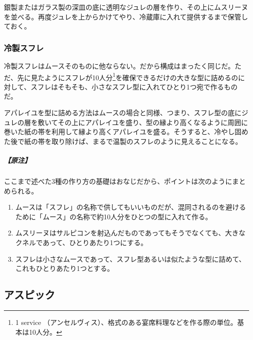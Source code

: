 \begin{recette}
銀製またはガラス製の深皿の底に透明なジュレの層を作り、その上にムスリーヌを並べる。再度ジュレを上からかけてやり、冷蔵庫に入れて提供するまで保管しておく。

\hypertarget{souffles-froids}{%
\subsubsection{冷製スフレ}\label{souffles-froids}}



冷製スフレはムースそのものに他ならない。だから構成はまったく同じだ。ただ、先に見たようにスフレが10人分\footnote{1
  service
  （アンセルヴィス）、格式のある宴席料理などを作る際の単位。基本は10人分。}を確保できるだけの大きな型に詰めるのに対して、スフレはそもそも、小さなスフレ型に入れてひとり1つ宛で作るものだ。

アパレイユを型に詰める方法はムースの場合と同様、つまり、スフレ型の底にジュレの層を敷いてその上にアパレイユを盛り、型の縁より高くなるように周囲に巻いた紙の帯を利用して縁より高くアパレイユを盛る。そうすると、冷やし固めた後で紙の帯を取り除けば、まるで温製のスフレのように見えることになる。

\hypertarget{nota-souffles-froids}{%
\subparagraph{【原注】}\label{nota-souffles-froids}}

ここまで述べた3種の作り方の基礎はおなじだから、ポイントは次のようにまとめられる。

\begin{enumerate}
\def\labelenumi{\arabic{enumi}.}
\item
  ムースは「スフレ」の名称で供してもいいものだが、混同されるのを避けるために「ムース」の名称で約10人分をひとつの型に入れて作る。
\item
  ムスリーヌはサルピコンを射込んだものであってもそうでなくても、大きなクネルであって、ひとりあたり1つにする。
\item
  スフレは小さなムースであって、スフレ型あるいは似たような型に詰めて、これもひとりあたり1つとする。
\end{enumerate}
\end{recette}
\hypertarget{aspics}{%
\subsection{アスピック}\label{aspics}}

